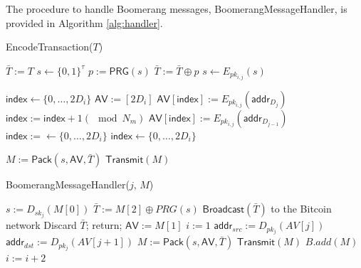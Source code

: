 The procedure to handle Boomerang messages, {\sf BoomerangMessageHandler}, is provided in Algorithm \ref{alg:handler}. 

\begin{algorithm*}[t!]
\caption{{\sf EncodeTransaction}($T$)}
\label{alg:encode}
\begin{algorithmic}[1]

	\State $\bar{T} := T$
	\State $s \gets \{0,1\}^{\tau}$
		\State $p := \mathsf{PRG}(s)$
		\State $\bar{T} := \bar{T} \oplus p$
		\State $s \gets E_{pk_{i,j}}(s)$
	\EndFor

	\State $\mathsf{index} \gets \{0,\dots,2D_i\}$ %
	\State $\mathsf{AV} := [2D_i]$ %
		\State $\mathsf{AV}[\mathsf{index}] := E_{pk_{i,j}}(\mathsf{addr}_{D_j})$
		\State $\mathsf{index} := \mathsf{index} + 1 (\mod N_m)$
		\State $\mathsf{AV}[\mathsf{index}] := E_{pk_{i,j}}(\mathsf{addr}_{D_{j-1}})$
		\State $\mathsf{index} := \gets \{0,\dots,2D_i\}$
			\State $\mathsf{index} \gets \{0,\dots,2D_i\}$
		\EndWhile
	\EndFor

	\State $M := \mathsf{Pack}(s, \mathsf{AV}, \bar{T})$
	\State $\mathsf{Transmit}(M)$
\EndFor

\end{algorithmic}
\end{algorithm*}

\begin{algorithm*}[t!]
\caption{{\sf BoomerangMessageHandler}($j$, $M$)}
\label{alg:handler}
\begin{algorithmic}[1]

\State $s := D_{sk_{j}}(M[0])$
\State $\bar{T} := M[2] \oplus PRG(s)$
	\State $\mathsf{Broadcast}(\bar{T})$ to the Bitcoin network
	\State Discard $\bar{T}$; return;
\Else
	\State $\mathsf{AV} := M[1]$
	\State $i := 1$
		\State $\mathsf{addr}_{src} := D_{pk_j}(AV[j])$
			\State $\mathsf{addr}_{dst} := D_{pk_j}(AV[j + 1])$
			\State $M := \mathsf{Pack}(s, \mathsf{AV}, \bar{T})$
				\State $\mathsf{Transmit}(M)$
			\Else
				\State $B.add(M)$
			\EndIf
		\Else
			\State $i := i + 2$
		\EndIf
	\EndWhile
\EndIf

\end{algorithmic}
\end{algorithm*}

